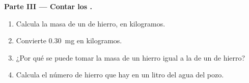 \begin{problem}
\medskip
\noindent\textbf{Parte III --- Contar los .}
\begin{enumerate}[resume]
  \item Calcula la masa de un  de hierro, en kilogramos.
  \item Convierte \qty{0.30}{mg} en kilogramos.
  \item ¿Por qué se puede tomar la masa de un  hierro igual a la de un
         de hierro?
  \item Calcula el número de  hierro que hay en un litro del agua
        del pozo.
\end{enumerate}
\end{problem}
